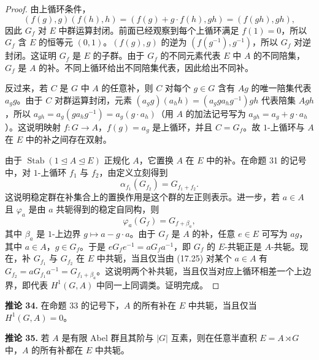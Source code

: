 \begin{proof}
由上循环条件，
\[
  (f(g),g)(f(h),h)=(f(g)+g\cdot f(h),gh)=(f(gh),gh),
\]
因此 $G_f$ 对 $E$ 中群运算封闭。前面已经观察到每个上循环满足 $f(1)=0$，所以 $G_f$ 含 $E$ 的恒等元 $(0,1)$。$(f(g),g)$ 的逆为 $(f(g^{-1}),g^{-1})$，所以 $G_f$ 对逆封闭。这证明 $G_f$ 是 $E$ 的子群。由于 $G_f$ 的不同元素代表 $E$ 中 $A$ 的不同陪集，$G_f$ 是 $A$ 的补。不同上循环给出不同陪集代表，因此给出不同补。

反过来，若 $C$ 是 $G$ 中 $A$ 的任意补，则 $C$ 对每个 $g\in G$ 含有 $Ag$ 的唯一陪集代表 $a_gg$。由于 $C$ 对群运算封闭，元素 $(a_gg)(a_hh)=(a_gga_hg^{-1})gh$ 代表陪集 $Agh$，所以 $a_{gh}=a_g(ga_hg^{-1})=a_g(g\cdot a_h)$（用 $A$ 的加法记号写为 $a_{gh}=a_g+g\cdot a_h$）。这说明映射 $f:G\to A$，$f(g)=a_g$ 是上循环，并且 $C=G_f$。故 $1$-上循环与 $A$ 在 $E$ 中的补之间存在双射。

由于 $\operatorname{Stab}(1\trianglelefteq A\trianglelefteq E)$ 正规化 $A$，它置换 $A$ 在 $E$ 中的补。在命题 31 的记号中，对 $1$-上循环 $f_1$ 与 $f_2$，由定义立刻得到
\[
  \alpha_{f_1}(G_{f_2})=G_{f_1+f_2}.
\]
这说明稳定群在补集合上的置换作用是这个群的左正则表示。进一步，若 $a\in A$ 且 $\varphi_a$ 是由 $a$ 共轭得到的稳定自同构，则
\[
  \varphi_a(G_f)=G_{f+\beta_a},
  \tag{17.25}
\]
其中 $\beta_a$ 是 $1$-上边界 $g\mapsto a-g\cdot a$。由于 $G_f$ 是 $A$ 的补，任意 $e\in E$ 可写为 $ag$，其中 $a\in A$，$g\in G_f$。于是 $eG_fe^{-1}=aG_fa^{-1}$，即 $G_f$ 的 $E$-共轭正是 $A$-共轭。现在，补 $G_{f_1}$ 与 $G_{f_2}$ 在 $E$ 中共轭，当且仅当由 (17.25) 对某个 $a\in A$ 有 $G_{f_2}=aG_{f_1}a^{-1}=G_{f_1+\beta_a}$。这说明两个补共轭，当且仅当对应上循环相差一个上边界，即代表 $H^1(G,A)$ 中同一上同调类。证明完成。
\end{proof}

\medskip
\noindent\textbf{推论 34.} 在命题 33 的记号下，$A$ 的所有补在 $E$ 中共轭，当且仅当 $H^1(G,A)=0$。

\medskip
\noindent\textbf{推论 35.} 若 $A$ 是有限 Abel 群且其阶与 $|G|$ 互素，则在任意半直积 $E=A\rtimes G$ 中，$A$ 的所有补都在 $E$ 中共轭。

